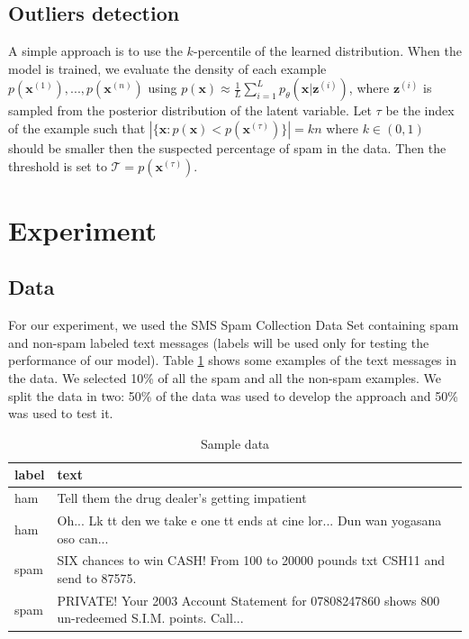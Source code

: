 \documentclass[10pt]{article}
\begin{document}
\subsection{Outliers detection}
\label{subsection:oultiers}
A simple approach is to use the $k$-percentile of the learned distribution. When the model is trained, we evaluate the density of each example $p(\bm{x}^{(1)}),...,p(\bm{x}^{(n)})$ using $p(\mathbf{x})\approx\frac{1}{L}\sum_{i=1}^L p_\theta(\mathbf{x}|\mathbf{z}^{(i)})$, where $\mathbf{z}^{(i)}$ is sampled from the posterior distribution of the latent variable. Let $\tau$ be the index of the example such that $|\{\bm{x} : p(\bm{x}) < p(\bm{x}^{(\tau)})\}|=kn$ where $k\in (0, 1)$ should be smaller then the suspected percentage of spam in the data. Then the threshold is set to $\mathcal{T}=p(\bm{x}^{(\tau)})$.

\section{Experiment}

\subsection{Data}
For our experiment, we used the SMS Spam Collection Data Set containing spam
and non-spam labeled text messages (labels will be used only for testing the performance of
our model). Table \ref{tab:data} shows some examples of the text messages in the data. We selected 10\% of all the spam and all the non-spam examples. We split the data in two: 50\% of the data was used to develop the approach and 50\% was used to test it.

\begin{table}
	\caption{Sample data}
	\centering
	\begin{tabular}{ll}
		\toprule
		label     & text \\
		\midrule
		ham & Tell them the drug dealer's getting impatient \\
		ham & Oh... Lk tt den we take e one tt ends at cine lor... Dun wan yogasana oso can... \\
		spam & SIX chances to win CASH! From 100 to 20000 pounds txt CSH11 and send to 87575.\\
		spam & PRIVATE! Your 2003 Account Statement for 07808247860 shows 800 un-redeemed S.I.M. points. Call...\\
		\bottomrule
	\end{tabular}
	\label{tab:data}
\end{table}
\end{document}
